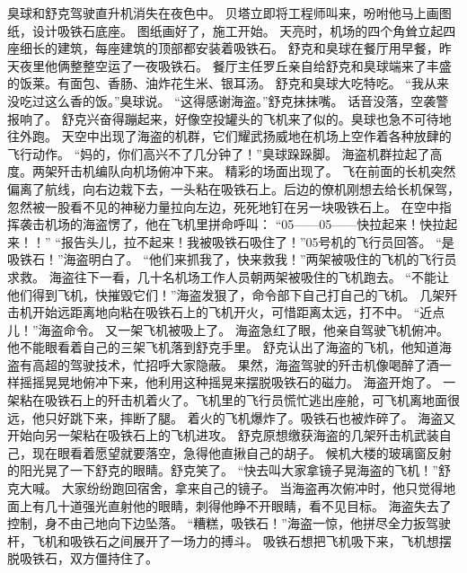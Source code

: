 \documentclass[a4paper,12pt,UTF8,twoside]{ctexbook}
\begin{document}
        臭球和舒克驾驶直升机消失在夜色中。 
        贝塔立即将工程师叫来，吩咐他马上画图纸，设计吸铁石底座。 
        图纸画好了，施工开始。 
        天亮时，机场的四个角耸立起四座细长的建筑，每座建筑的顶部都安装着吸铁石。 
        舒克和臭球在餐厅用早餐，昨天夜里他俩整整空运了一夜吸铁石。 
        餐厅主任罗丘亲自给舒克和臭球端来了丰盛的饭莱。有面包、香肠、油炸花生米、银耳汤。 
        舒克和臭球大吃特吃。 
        “我从来没吃过这么香的饭。”臭球说。 
        “这得感谢海盗。”舒克抹抹嘴。 
        话音没落，空袭警报响了。 
        舒克兴奋得蹦起来，好像空投罐头的飞机来了似的。臭球也急不可待地往外跑。 
        天空中出现了海盗的机群，它们耀武扬威地在机场上空作着各种放肆的飞行动作。 
        “妈的，你们高兴不了几分钟了！”臭球跺跺脚。 
        海盗机群拉起了高度。两架歼击机编队向机场俯冲下来。 
        精彩的场面出现了。 
        飞在前面的长机突然偏离了航线，向右边栽下去，一头粘在吸铁石上。后边的僚机刚想去给长机保驾，忽然被一股看不见的神秘力量拉向左边，死死地钉在另一块吸铁石上。 
        在空中指挥袭击机场的海盗愣了，他在飞机里拼命呼叫： 
        “05——05——快拉起来！快拉起来！！” 
        “报告头儿，拉不起来！我被吸铁石吸住了！”05号机的飞行员回答。 
        “是吸铁石！”海盗明白了。 
        “他们来抓我了，快来救我！”两架被吸住的飞机的飞行员求救。 
        海盗往下一看，几十名机场工作人员朝两架被吸住的飞机跑去。 
        “不能让他们得到飞机，快摧毁它们！”海盗发狠了，命令部下自己打自己的飞机。 
        几架歼击机开始远距离地向粘在吸铁石上的飞机开火，可惜距离太远，打不中。 
        “近点儿！”海盗命令。 
        又一架飞机被吸上了。 
        海盗急红了眼，他亲自驾驶飞机俯冲。他不能眼看着自己的三架飞机落到舒克手里。 
        舒克认出了海盗的飞机，他知道海盗有高超的驾驶技术，忙招呼大家隐蔽。 
        果然，海盗驾驶的歼击机像喝醉了酒一样摇摇晃晃地俯冲下来，他利用这种摇晃来摆脱吸铁石的磁力。 
        海盗开炮了。 
        一架粘在吸铁石上的歼击机着火了。飞机里的飞行员慌忙逃出座舱，可飞机离地面很远，他只好跳下来，摔断了腿。 
        着火的飞机爆炸了。吸铁石也被炸碎了。 
        海盗又开始向另一架粘在吸铁石上的飞机进攻。 
        舒克原想缴获海盗的几架歼击机武装自己，现在眼看着愿望就要落空，急得他直揪自己的胡子。 
        候机大楼的玻璃窗反射的阳光晃了一下舒克的眼睛。舒克笑了。 
        “快去叫大家拿镜子晃海盗的飞机！”舒克大喊。 
        大家纷纷跑回宿舍，拿来自己的镜子。 
        当海盗再次俯冲时，他只觉得地面上有几十道强光直射他的眼睛，刺得他睁不开眼睛，看不见目标。 
        海盗失去了控制，身不由己地向下边坠落。 
        “糟糕，吸铁石！”海盗一惊，他拼尽全力扳驾驶杆，飞机和吸铁石之间展开了一场力的搏斗。 
        吸铁石想把飞机吸下来，飞机想摆脱吸铁石，双方僵持住了。 
\end{document}
